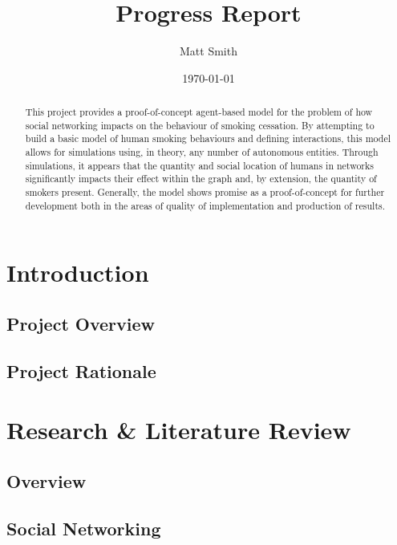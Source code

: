 \documentclass[]{report}
\begin{document}
\title{Progress Report}
\author{Matt Smith}
\date{\today}
\maketitle
\begin{abstract}
This project provides a proof-of-concept agent-based model for the problem of how social networking impacts on the behaviour of smoking cessation. By attempting to build a basic model of human smoking behaviours and defining interactions, this model allows for  simulations using, in theory, any number of autonomous entities. Through simulations, it appears that the quantity and social location of humans in networks significantly impacts their effect within the graph and, by extension, the quantity of smokers present. Generally, the model shows promise as a proof-of-concept for further development both in the areas of quality of implementation and production of results.
\end{abstract}

\tableofcontents

%
%
\chapter{Introduction}

\section{Project Overview}

\section{Project Rationale}

%
%

%
%
\chapter{Research \& Literature Review}

\section{Overview}
\section{Social Networking}
\end{document}
